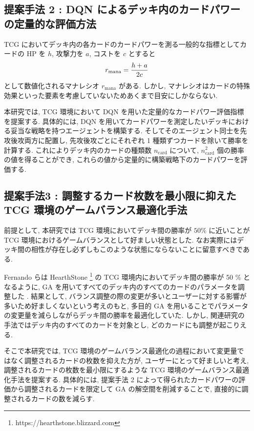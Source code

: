 \documentclass[twocolumn]{jarticle}     %
\begin{document}
\subsection{提案手法 2 : DQN によるデッキ内のカードパワーの定量的な評価方法}
\label{manaratio}
TCG においてデッキ内の各カードのカードパワーを測る一般的な指標としてカードの HP を $h$, 攻撃力を $a$, コストを $c$ とすると
\begin{equation*}
   \small
   r_\mathrm{mana} = \frac{h+a}{2c}
\end{equation*}
として数値化されるマナレシオ $r_\mathrm{mana}$ がある. 
しかし, マナレシオはカードの特殊効果といった要素を考慮していないためあくまで目安にしかならない. \par
本研究では, TCG 環境において DQN を用いた定量的なカードパワー評価指標を提案する.
具体的には, DQN を用いてカードパワーを測定したいデッキにおける妥当な戦略を持つエージェントを構築する. 
そしてそのエージェント同士を先攻後攻両方に配置し, 先攻後攻ごとにそれぞれ 1 種類ずつカードを除いて勝率を計算する. これによりデッキ内のカードの種類数 $n_{\mathrm{card}}$ について, $n_{\mathrm{card}}^2$ 個の勝率の値を得ることができ, これらの値から定量的に構築戦略下のカードパワーを評価する. 

\subsection{提案手法3 : 調整するカード枚数を最小限に抑えた TCG 環境のゲームバランス最適化手法}
\label{hearthstone}
前提として, 本研究では TCG 環境においてデッキ間の勝率が $50\%$ に近いことが TCG 環境におけるゲームバランスとして好ましい状態とした. なお実際にはデッキ間の相性が存在し必ずしもこのような状態にならないことに留意すべきである.
\par
Fernando らは HearthStone \footnote[1]{https://hearthstone.blizzard.com} の TCG 環境内においてデッキ間の勝率が 50 \% となるように, GA を用いてすべてのデッキ内のすべてのカードのパラメータを調整した \cite{Hearthstone}.
結果として, バランス調整の際の変更が多いとユーザーに対する影響が多いため好ましくないという考えのもと, 多目的 GA を用いることでパラメータの変更量を減らしながらデッキ間の勝率を最適化していた.
しかし, 関連研究の手法ではデッキ内のすべてのカードを対象とし, どのカードにも調整が起こりえる.
\par
そこで本研究では, TCG 環境のゲームバランス最適化の過程において変更量ではなく調整されるカードの枚数を抑えた方が, ユーザーにとって好ましいと考え, 調整されるカードの枚数を最小限にするような TCG 環境のゲームバランス最適化手法を提案する.
具体的には, 提案手法 2 によって得られたカードパワーの評価から調整されるカードを限定して GA の解空間を削減することで, 直接的に調整されるカードの数を減らす.
\vspace{-0.20cm}
\end{document}
